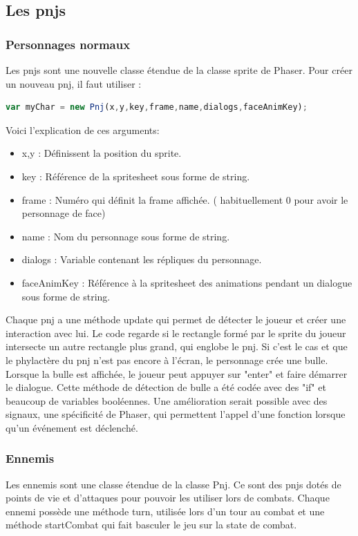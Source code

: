 \documentclass[11pt]{article}
\begin{document}
\subsection{Les pnjs}
\subsubsection{Personnages normaux}
Les pnjs sont une nouvelle classe étendue de la classe sprite de Phaser. Pour créer un nouveau pnj, il faut utiliser :
 \begin{lstlisting}[language=JavaScript]
var myChar = new Pnj(x,y,key,frame,name,dialogs,faceAnimKey);
\end{lstlisting}
Voici l'explication de ces arguments:
\begin{itemize}
\item x,y : Définissent la position du sprite.
\item key : Référence de la spritesheet sous forme de string.
\item frame : Numéro qui définit la frame affichée. ( habituellement 0 pour avoir le personnage de face) 
\item name : Nom du personnage sous forme de string.
\item dialogs : Variable contenant les répliques du personnage.
\item faceAnimKey : Référence à la spritesheet des animations pendant un dialogue sous forme de string.
\end{itemize}
Chaque pnj a une méthode update qui permet de détecter le joueur et créer une interaction avec lui. Le code regarde si le rectangle formé par le sprite du joueur intersecte un autre rectangle plus grand, qui englobe le pnj. Si c'est le cas et que le phylactère du pnj n'est pas encore à l'écran, le personnage crée une bulle. Lorsque la bulle est affichée, le joueur peut appuyer sur "enter" et faire démarrer le dialogue. Cette méthode de détection de bulle a été codée avec des "if" et beaucoup de variables booléennes. Une amélioration serait possible avec des signaux, une spécificité de Phaser, qui permettent l'appel d'une fonction lorsque qu'un événement est déclenché.\subsubsection{Ennemis}
Les ennemis sont une classe étendue de la classe Pnj. Ce sont des pnjs dotés de points de vie et d'attaques pour pouvoir les utiliser lors de combats. Chaque ennemi possède une méthode turn, utilisée lors d'un tour au combat et une méthode startCombat qui fait basculer le jeu sur la state de combat.
\end{document}
